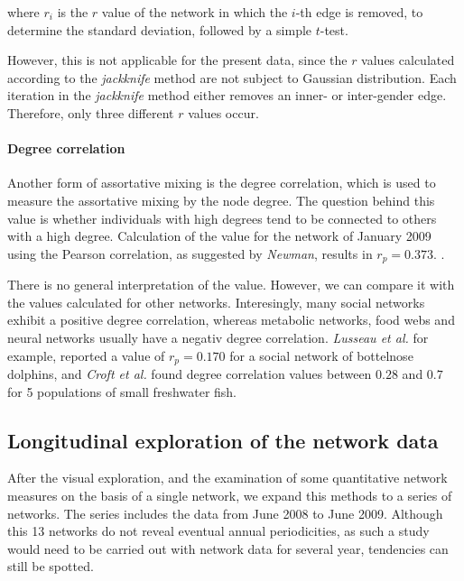 where $r_i$ is the $r$ value of the network in which the $i$-th edge is removed, to determine the standard deviation, followed by a simple $t$-test\cite{snijders:99}.

However, this is not applicable for the present data, since the $r$ values calculated according to the \textit{jackknife} method are not subject to Gaussian distribution. Each iteration in the \textit{jackknife} method either removes an inner- or inter-gender edge. Therefore, only three different $r$ values occur.

\paragraph{Degree correlation}
\label{para:degree_corr}
 
Another form of assortative mixing is the degree correlation, which is used to measure the assortative mixing by the node degree. The question behind this value is whether individuals with high degrees tend to be connected to others with a high degree\cite{croft:07}. Calculation of the value for the network of January 2009 using the Pearson correlation, as suggested by \textit{Newman}\cite{newman:02}, results in $r_p = 0.373$. \cite{newman:03a}. 

There is no general interpretation of the value. However, we can compare it with the values calculated for other networks. Interesingly, many social networks exhibit a positive degree correlation, whereas metabolic networks, food webs and neural networks usually have a negativ degree correlation\cite{newman:03a}. \textit{Lusseau et al.}\cite{lusseau:06} for example, reported a value of $r_p = 0.170$ for a social network of bottelnose dolphins, and \textit{Croft et al.}\cite{croft:05} found degree correlation values between $0.28$ and $0.7$ for 5 populations of small freshwater fish.   
 
\subsection{Longitudinal exploration of the network data}
\label{subsec:longitudinal}

After the visual exploration, and the examination of some quantitative network measures on the basis of a single network, we expand this methods to a series of networks. The series includes the data from June 2008 to June 2009. Although this 13 networks do not reveal eventual annual periodicities, as such a study would need to be carried out with network data for several year, tendencies can still be spotted.
 
